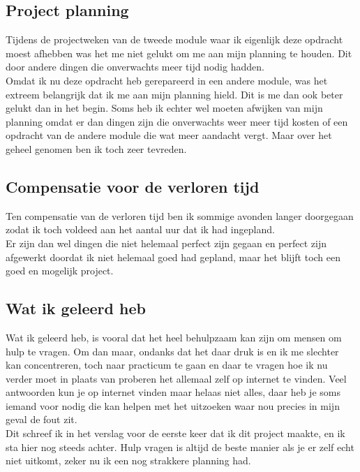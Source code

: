 \documentclass[12pt]{article}
\begin{document}
\subsection{Project planning}
Tijdens de projectweken van de tweede module waar ik eigenlijk deze opdracht moest afhebben was het me niet gelukt om me aan mijn planning te houden. Dit door andere dingen die onverwachts meer tijd nodig hadden.\\
Omdat ik nu deze opdracht heb gerepareerd in een andere module, was het extreem belangrijk dat ik me aan mijn planning hield. Dit is me dan ook beter gelukt dan in het begin.  Soms heb ik echter wel moeten afwijken van mijn planning omdat er dan dingen zijn die onverwachts weer meer tijd kosten of een opdracht van de andere module die wat meer aandacht vergt. Maar over het geheel genomen ben ik toch zeer tevreden.
\subsection{Compensatie voor de verloren tijd}
Ten compensatie van de verloren tijd ben ik sommige avonden langer doorgegaan zodat ik toch voldeed aan het aantal uur dat ik had ingepland.\\
Er zijn dan wel dingen die niet helemaal perfect zijn gegaan en perfect zijn afgewerkt doordat ik niet helemaal goed had gepland, maar het blijft toch een goed en mogelijk project.
\subsection{Wat ik geleerd heb}
Wat ik geleerd heb, is vooral dat het heel behulpzaam kan zijn om mensen om hulp te vragen. Om dan maar, ondanks dat het daar druk is en ik me slechter kan concentreren, toch naar practicum te gaan en daar te vragen hoe ik nu verder moet in plaats van proberen het allemaal zelf op internet te vinden. Veel antwoorden kun je op internet vinden maar helaas niet alles, daar heb je soms iemand voor nodig die kan helpen met het uitzoeken waar nou precies in mijn geval de fout zit.\\
Dit schreef ik in het verslag voor de eerste keer dat ik dit project maakte, en ik sta hier nog steeds achter. Hulp vragen is altijd de beste manier als je er zelf echt niet uitkomt, zeker nu ik een nog strakkere planning had.
\end{document}

